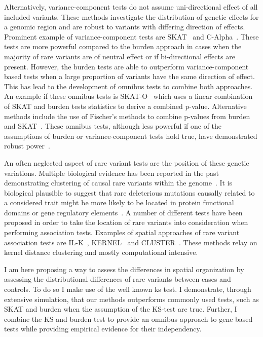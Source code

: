 Alternatively, variance-component tests do not assume uni-directional effect of all included variants. 
These methods investigate the distribution of genetic effects for a genomic region and are robust to variants with differing direction of effects.
Prominent example of variance-component tests are SKAT~\cite{Wu2011} and C-Alpha~\cite{Neale2011}.
These tests are more powerful compared to the burden approach in cases when the majority of rare variants are of neutral effect or if bi-directional effects are present.
However, the burden tests are able to outperform variance-component based tests when a large proportion of variants have the same direction of effect.
This has lead to the development of omnibus tests to combine both approaches.
An example if these omnibus tests is SKAT-O~\cite{Lee2012a} which uses a linear combination of SKAT and burden tests statistics to derive a combined p-value.
Alternative methods include the use of Fischer's methods to combine p-values from burden and SKAT~\cite{Derkach2013a}.
These omnibus tests, although less powerful if one of the assumptions of burden or variance-component tests hold true, have demonstrated robust power~\cite{Lee2014}. 

An often neglected aspect of rare variant tests are the position of these genetic variations.
Multiple biological evidence has been reported in the past demonstrating clustering of causal rare variants within the genome~\cite{Ionita-Laza2012, Raab2010,Schaid2013,Fier2012}.
It is biological plausible to suggest that rare deleterious mutations causally related to a considered trait might be more likely to be located in protein functional domains or gene regulatory elements~\cite{Fier2012}.
A number of different tests have been proposed in order to take the location of rare variants into consideration when performing association tests.
Examples of spatial approaches of rare variant association tests are IL-K~\cite{Ionita-Laza2012}, KERNEL~\cite{Schaid2013} and CLUSTER~\cite{Lin2014}.
These methods relay on kernel distance clustering and mostly computational intensive.

I am here proposing a way to assess the differences in spatial organization by assessing the distributional differences of rare variants between cases and controls.
To do so I make use of the well known \acrfull{ks} test.
I demonstrate, through extensive simulation, that our methods outperforms commonly used tests, such as SKAT and burden when the assumption of the KS-test are true.
Further, I combine the KS and burden test to provide an omnibus approach to gene based tests while providing empirical evidence for their independency.
